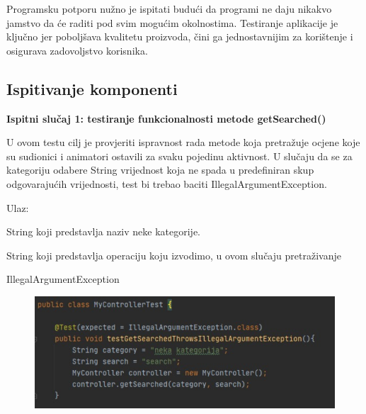 			 Programsku potporu nužno je ispitati budući da programi ne daju nikakvo jamstvo da će raditi pod svim mogućim okolnostima. Testiranje aplikacije je ključno jer poboljšava kvalitetu proizvoda, čini ga jednostavnijim za korištenje i osigurava zadovoljstvo korisnika.
	
			
			\subsection{Ispitivanje komponenti}
			\vspace{5mm} %
			\noindent
			\textbf{Ispitni slučaj 1: testiranje funkcionalnosti metode getSearched() }
			
			U ovom testu cilj je provjeriti ispravnost rada metode koja pretražuje ocjene koje su sudionici i animatori ostavili za svaku pojedinu aktivnost. U slučaju da se za kategoriju odabere String vrijednost koja ne spada u predefiniran skup odgovarajućih vrijednosti, test bi trebao baciti IllegalArgumentException.
			
		    \vspace{3mm} %
			Ulaz:
			\begin{packed_enum}
			    \item String koji predstavlja naziv neke kategorije.
			    \item String koji predstavlja operaciju koju izvodimo, u ovom slučaju pretraživanje
			\end{packed_enum}
			
			\noindent
			\begin{packed_enum}
			    \item IllegalArgumentException
			\end{packed_enum}
			
			\begin{figure}[H]
            \includegraphics[scale=1]{dokumentacija/slike/testSearch.PNG} %
            \centering
            \label{fig:promjene}
            \end{figure}
			
